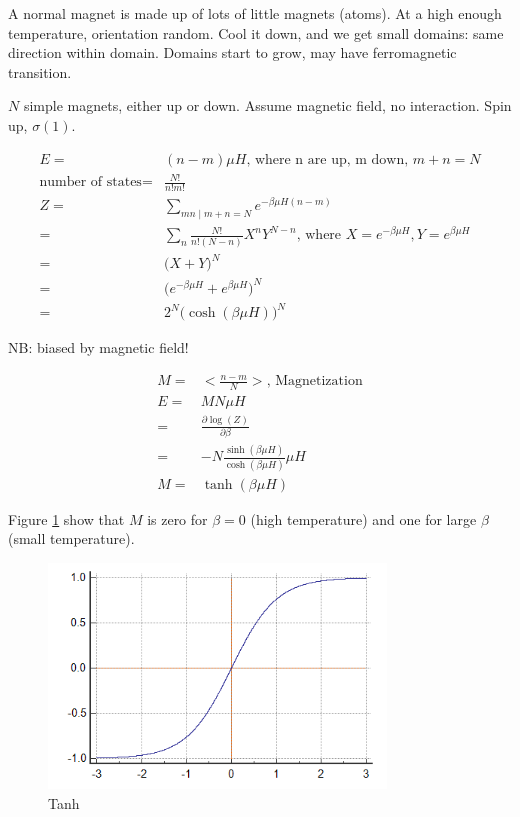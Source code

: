 \documentclass[]{article}
\begin{document}
A normal magnet is made up of lots of little magnets (atoms). At a high enough temperature, orientation random. Cool it down, and we get small domains: same direction within domain. Domains start to grow, may have ferromagnetic transition.

$N$ simple magnets, either up or down. Assume magnetic field, no interaction. Spin up, $\sigma(1).$

\begin{align*}
E=&(n-m)\mu H\text{, where n are up, m down, $m+n=N$}\\
\text{number of states} =&\frac{N!}{n!m!}\\
Z =&\sum_{mn\mid m+n=N} e^{- \beta \mu H(n-m)}\\
=&\sum_{n}\frac{N!}{n!(N-n)}X^nY^{N-n}\text{, where $X=e^{-\beta\mu H},Y=e^{\beta\mu H}$}\\
=&\big(X+Y\big)^N\\
=&\big(e^{-\beta\mu H}+e^{\beta\mu H}\big)^N\\
=&2^N \big(\cosh(\beta\mu H)\big)^N
\end{align*}

NB: biased by magnetic field!

\begin{align*}
	M =& \big< \frac{n-m}{N}\big>\text{, Magnetization} \\
	E =& M N \mu H\\
	=& \frac{\partial \log(Z)}{\partial \beta}\\
	=& - N \frac{\sinh(\beta\mu H)}{\cosh(\beta\mu H)} \mu H\\
	M=& \tanh(\beta\mu H)
\end{align*}

Figure \ref{fig:tanh} show that $M$ is zero for $\beta=0$ (high temperature) and one for large $\beta$ (small temperature).

\begin{figure}[H]
	\caption{Tanh}\label{fig:tanh}
	\includegraphics[width=0.8\textwidth]{tanh}
\end{figure}
\end{document}
